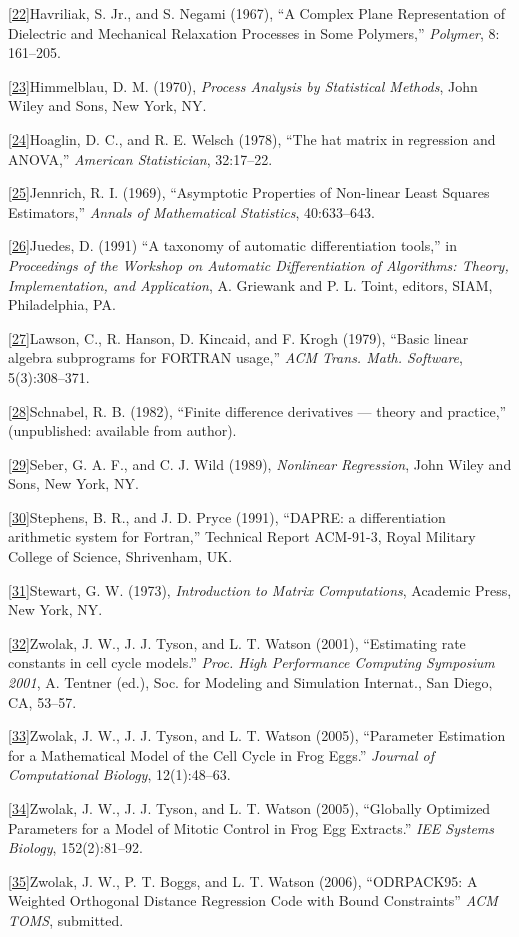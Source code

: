 \ref{22}{Havriliak, S. Jr., and S. Negami (1967), ``A Complex Plane Representation of Dielectric and Mechanical Relaxation Processes in Some Polymers,'' {\it Polymer\/}, 8: 161--205.}

\ref{23}{Himmelblau, D. M. (1970), {\it Process Analysis by Statistical Methods\/}, John Wiley and Sons, New York, NY.}

\ref{24}{Hoaglin, D. C., and R. E. Welsch (1978), ``The hat matrix in regression and ANOVA,'' {\it American Statistician\/}, 32:17--22.}

\ref{25}{Jennrich, R. I. (1969), ``Asymptotic Properties of Non-linear Least Squares Estimators,'' {\it Annals of Mathematical Statistics\/}, 40:633--643.}

\ref{26}{Juedes, D. (1991) ``A taxonomy of automatic differentiation tools,'' in {\it Proceedings of the Workshop on Automatic Differentiation of Algorithms: Theory, Implementation, and Application\/}, A. Griewank and P. L. Toint, editors, SIAM, Philadelphia, PA.}

\ref{27}{Lawson, C., R. Hanson, D. Kincaid, and F. Krogh (1979), ``Basic linear algebra subprograms for FORTRAN usage,'' {\it ACM Trans. Math. Software\/}, 5(3):308--371.}

\ref{28}{Schnabel, R. B. (1982), ``Finite difference derivatives --- theory and practice,'' (unpublished: available from author).}

\ref{29}{Seber, G. A. F., and C. J. Wild (1989), {\it Nonlinear Regression\/}, John Wiley and Sons, New York, NY.}

\ref{30}{Stephens, B. R., and J. D. Pryce (1991), ``DAPRE: a differentiation arithmetic system for Fortran,'' Technical Report ACM-91-3, Royal Military College of Science, Shrivenham, UK.}

\ref{31}{Stewart, G. W. (1973), {\it Introduction to Matrix Computations\/}, Academic Press, New York, NY.}

\ref{32}{Zwolak, J. W., J. J. Tyson, and L. T. Watson (2001), ``Estimating rate
constants in cell cycle models.'' {\it Proc. High Performance Computing
Symposium 2001}, A. Tentner (ed.), Soc. for Modeling and Simulation
Internat., San Diego, CA, 53--57.}

\ref{33}{Zwolak, J. W., J. J. Tyson, and L. T. Watson (2005), ``Parameter
Estimation for a Mathematical Model of the Cell Cycle in Frog Eggs.'' {\it
Journal of Computational Biology}, 12(1):48--63.}

\ref{34}{Zwolak, J. W., J. J. Tyson, and L. T. Watson (2005), ``Globally
Optimized Parameters for a Model of Mitotic Control in Frog Egg Extracts.'' {\it
IEE Systems Biology}, 152(2):81--92.}

\ref{35}{Zwolak, J. W., P. T. Boggs, and L. T. Watson (2006), ``ODRPACK95: A
Weighted Orthogonal Distance Regression Code with Bound Constraints'' {\it ACM
TOMS}, submitted.}

\vfil\eject\bye
